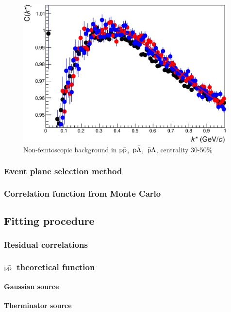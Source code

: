 \documentclass[ALICE,manyauthors]{ALICE_analysis_notes}
\newcommand{\pap}{$\rm p\bar{\rm p}$}
\newcommand{\pal}{$\rm p\bar{\rm \Lambda}$}
\newcommand{\apl}{$\bar{\rm p }\Lambda$}
\begin{document}
\begin{figure}[]
   \centering
   \includegraphics[width=0.99\textwidth]{pics/compBack3050}
   \caption{ Non-femtoscopic background in \pap,~\pal,~\apl, centrality 30-50$\%$}
   \label{fig:backCorrFun3050}
 \end{figure}

\subsubsection{Event plane selection method}

\subsubsection{Correlation function from Monte Carlo}

\subsection{Fitting procedure}

\subsubsection{Residual correlations}

\subsubsection{\pap~theoretical function}
\paragraph{Gaussian source}

\paragraph{Therminator source}
\end{document}
